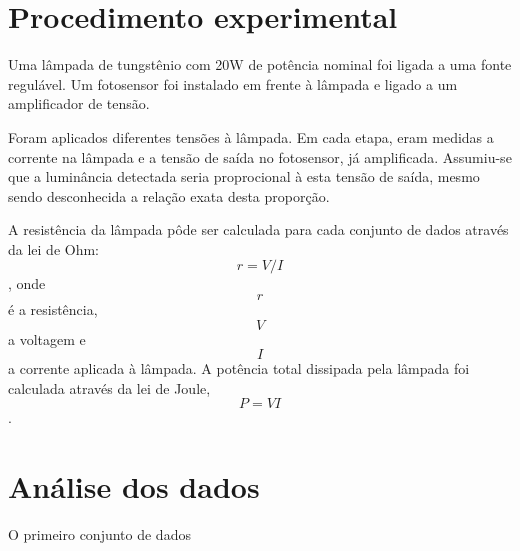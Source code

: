 \documentclass[brazilian,12pt,a4paper,final]{article}
\begin{document}
\section{Procedimento experimental}
Uma lâmpada de tungstênio com 20W de potência nominal foi ligada a uma fonte regulável. 
Um fotosensor foi instalado em frente à lâmpada e ligado a um amplificador de tensão.

Foram aplicados diferentes tensões à lâmpada.
Em cada etapa, eram medidas a corrente na lâmpada e a tensão de saída no fotosensor, já amplificada.
Assumiu-se que a luminância detectada seria proprocional à esta tensão de saída, mesmo sendo desconhecida 
a relação exata desta proporção.

A resistência da lâmpada pôde ser calculada para cada conjunto de dados através da lei de Ohm: $$ r=V/I $$, 
onde $$r$$ é a resistência, $$V$$ a voltagem e $$I$$ a corrente aplicada à lâmpada. 
A potência total dissipada pela lâmpada foi calculada através da lei de Joule, $$ P=VI $$.
\section{Análise dos dados}

O primeiro conjunto de dados 
\end{document}
